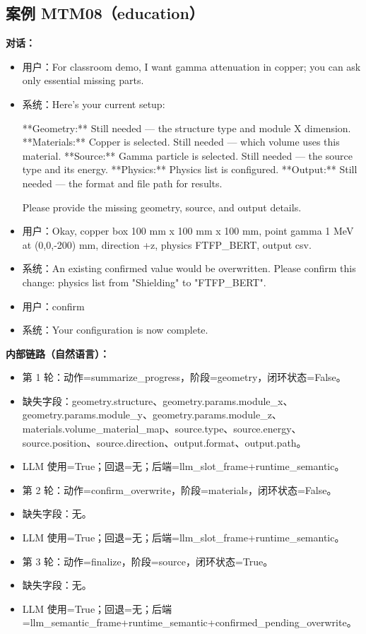 \documentclass[11pt]{ctexart}
\begin{document}
\subsection{案例 MTM08（education）}
\textbf{对话：}
\begin{itemize}
\item 用户：For classroom demo, I want gamma attenuation in copper; you can ask only essential missing parts.
\item 系统：Here's your current setup:

**Geometry:** Still needed — the structure type and module X dimension.
**Materials:** Copper is selected. Still needed — which volume uses this material.
**Source:** Gamma particle is selected. Still needed — the source type and its energy.
**Physics:** Physics list is configured.
**Output:** Still needed — the format and file path for results.

Please provide the missing geometry, source, and output details.
\item 用户：Okay, copper box 100 mm x 100 mm x 100 mm, point gamma 1 MeV at (0,0,-200) mm, direction +z, physics FTFP\_BERT, output csv.
\item 系统：An existing confirmed value would be overwritten. Please confirm this change: physics list from "Shielding" to "FTFP\_BERT".
\item 用户：confirm
\item 系统：Your configuration is now complete.
\end{itemize}
\textbf{内部链路（自然语言）：}
\begin{itemize}
\item 第 1 轮：动作=summarize\_progress，阶段=geometry，闭环状态=False。
\item 缺失字段：geometry.structure、geometry.params.module\_x、geometry.params.module\_y、geometry.params.module\_z、materials.volume\_material\_map、source.type、source.energy、source.position、source.direction、output.format、output.path。
\item LLM 使用=True；回退=无；后端=llm\_slot\_frame+runtime\_semantic。
\item 第 2 轮：动作=confirm\_overwrite，阶段=materials，闭环状态=False。
\item 缺失字段：无。
\item LLM 使用=True；回退=无；后端=llm\_slot\_frame+runtime\_semantic。
\item 第 3 轮：动作=finalize，阶段=source，闭环状态=True。
\item 缺失字段：无。
\item LLM 使用=True；回退=无；后端=llm\_semantic\_frame+runtime\_semantic+confirmed\_pending\_overwrite。
\end{itemize}
\end{document}
